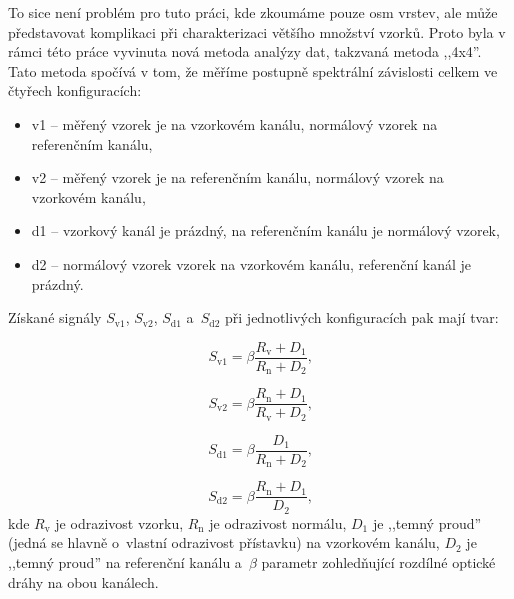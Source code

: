 To sice není problém pro tuto práci, kde zkoumáme pouze osm vrstev, ale může představovat komplikaci při charakterizaci většího množství vzorků. Proto byla v rámci této práce vyvinuta nová metoda analýzy dat, takzvaná metoda ,,4x4''. Tato metoda spočívá v tom, že měříme postupně spektrální závislosti celkem ve čtyřech konfiguracích:
\begin{itemize}
  \item v1 -- měřený vzorek je na vzorkovém kanálu, normálový vzorek na referenčním kanálu,
  \item v2 -- měřený vzorek je na referenčním kanálu, normálový vzorek na vzorkovém kanálu,
  \item d1 -- vzorkový kanál je prázdný, na referenčním kanálu je normálový vzorek,
  \item d2 -- normálový vzorek vzorek na vzorkovém kanálu, referenční kanál je prázdný.
\end{itemize}
%
Získané signály $S_\mathrm{v1}$, $S_\mathrm{v2}$, $S_\mathrm{d1}$ a~$S_\mathrm{d2}$ při jednotlivých konfiguracích pak mají tvar:

\begin{equation}
S_\mathrm{v1} = \beta \frac{R_\mathrm{v} + D_1}{R_\mathrm{n} + D_2} \text{,}
\end{equation}

\begin{equation}
S_\mathrm{v2} = \beta \frac{R_\mathrm{n} + D_1}{R_\mathrm{v} + D_2} \text{,}
\end{equation}

\begin{equation}
S_\mathrm{d1} = \beta \frac{D_1}{R_\mathrm{n} + D_2} \text{,}
\end{equation}

\begin{equation}
S_\mathrm{d2} = \beta \frac{R_\mathrm{n} + D_1}{D_2} \text{,}
\end{equation}
kde $R_\mathrm{v}$ je odrazivost vzorku, $R_\mathrm{n}$ je odrazivost normálu, $D_1$ je ,,temný proud'' (jedná se hlavně o~vlastní odrazivost přístavku) na vzorkovém kanálu, $D_2$ je ,,temný proud'' na referenční kanálu a~$\beta$ parametr zohledňující rozdílné optické dráhy na obou kanálech. 

